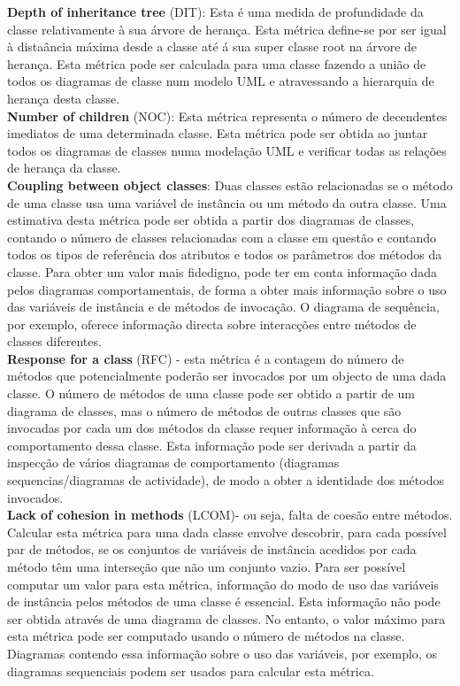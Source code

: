 \documentclass[10pt]{article}
\begin{document}
\textbf{Depth of inheritance tree} (DIT):
Esta é uma medida de profundidade da classe relativamente à sua árvore de herança. Esta métrica define-se por ser igual à distaância máxima
desde a classe até á sua super classe root na árvore de herança. Esta métrica pode ser calculada para uma classe fazendo a união de todos os diagramas
de classe num modelo UML e atravessando a hierarquia de herança desta classe.\\

\textbf{Number of children} (NOC): Esta métrica representa o número de decendentes imediatos de uma determinada classe. Esta métrica pode ser obtida ao juntar todos os diagramas de classes numa modelação UML e verificar todas as relações de herança da classe.\\

\textbf{Coupling between object classes}: Duas classes estão relacionadas se o método de uma classe usa uma variável de instância ou um método da outra classe. Uma estimativa desta métrica pode ser obtida a partir dos diagramas de classes, contando o número de classes relacionadas com a classe em questão e contando todos os tipos de referência dos atributos e todos os parâmetros dos métodos da classe. Para obter um valor mais fidedigno, pode ter em conta informação dada pelos diagramas comportamentais, de forma a obter mais informação sobre o uso das variáveis de instância e de métodos de invocação. O diagrama de sequência, por exemplo, oferece informação directa sobre interacções entre métodos de classes diferentes. \\

\textbf{Response for a class} (RFC) - esta métrica é a contagem do número de métodos que potencialmente poderão ser invocados por um objecto de uma dada classe. O número de métodos de uma classe pode ser obtido a partir de um diagrama de classes, mas o número de métodos de outras classes que são invocadas por cada um dos métodos da classe requer informação à cerca do comportamento dessa classe. Esta informação pode ser derivada a partir da inspecção de vários diagramas de comportamento (diagramas sequencias/diagramas de actividade), de modo a obter a identidade dos métodos invocados.\\


\textbf{Lack of cohesion in methods} (LCOM)- ou seja, falta de coesão entre métodos. Calcular esta métrica para uma dada classe envolve descobrir, para cada possível par de métodos, se os conjuntos de variáveis de instância acedidos por cada método têm uma interseção que não um conjunto vazio.
Para ser possível computar um valor para esta métrica, informação do modo de uso das variáveis de instância pelos métodos de uma classe é essencial. Esta informação não pode ser obtida através de uma diagrama de classes. No entanto, o valor máximo para esta métrica pode ser computado usando o número de métodos na classe. Diagramas contendo essa informação sobre o uso das variáveis, por exemplo, os diagramas sequenciais podem ser usados para calcular esta métrica.\\
\end{document}

